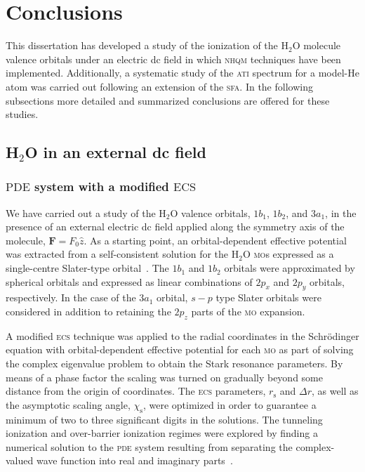 \chapter{Conclusions}
\label{ch:conclusions}

This dissertation has developed a study of the ionization of the
H$_{2}$O molecule valence orbitals under an electric dc field in which
\textsc{nhqm} techniques have been implemented. Additionally, a
systematic study of the \textsc{ati} spectrum for a model-He atom was
carried out following an extension of the \textsc{sfa}. In the
following subsections more detailed and summarized conclusions are
offered for these studies.

\section{H$_{2}$O in an external dc field}
\label{ch:h2o_results}

\subsection*{$\mathrm{PDE}$ system with a modified $\mathrm{ECS}$}



We have carried out a study of the H$_{2}$O valence orbitals,
$1b_{1}$, $1b_{2}$, and $3a_{1}$, in the presence of an external
electric dc field applied along the symmetry axis of the molecule,
$\mathbf{F} = F_{0}\hat{z}$. As a starting point, an orbital-dependent
effective potential was extracted from a self-consistent solution for
the H$_{2}$O \textsc{mo}s expressed as a single-centre Slater-type
orbital~\cite{Moccia_1964}. The $1b_{1}$ and $1b_{2}$ orbitals were
approximated by spherical orbitals and expressed as linear
combinations of $2p_{x}$ and $2p_{y}$ orbitals, respectively. In the
case of the $3a_{1}$ orbital, $s-p$ type Slater orbitals were
considered in addition to retaining the $2p_{z}$ parts of the
\textsc{mo} expansion.

A modified \textsc{ecs} technique was applied to the radial
coordinates in the Schr\"{o}dinger equation with orbital-dependent
effective potential for each \textsc{mo} as part of solving the
complex eigenvalue problem to obtain the Stark resonance
parameters. By means of a phase factor the scaling was turned on
gradually beyond some distance from the origin of coordinates. The
\textsc{ecs} parameters, $r_{\mathrm{s}}$ and $\Delta r$, as well as
the asymptotic scaling angle, $\chi_{\mathrm{s}}$, were optimized in
order to guarantee a minimum of two to three significant digits in the
solutions. The tunneling ionization and over-barrier ionization
regimes were explored by finding a numerical solution to the
\textsc{pde} system resulting from separating the complex-valued wave
function into real and imaginary parts~\cite{sarias_2016,sarias_2017}.


